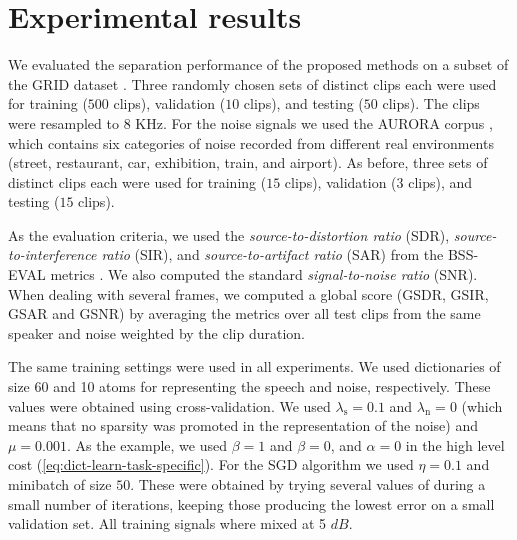 \section{Experimental results}
\label{sec:experiments}

 We evaluated the separation performance of the proposed methods on a subset of the GRID dataset \cite{cooke2006audio}. 
Three randomly chosen sets of distinct clips each were used for training ($500$ clips), validation ($10$ clips), and testing ($50$ clips).
The clips were resampled to $8$ KHz. For the noise signals we used the AURORA corpus \cite{PearceH00}, which contains six categories of noise recorded from different real environments (street, restaurant, car, exhibition, train, and airport). As before, three sets of distinct clips each were used for training ($15$ clips), validation ($3$ clips), and testing ($15$ clips).

 As the evaluation criteria, we used the \emph{source-to-distortion ratio} (SDR), \emph{source-to-interference ratio} (SIR), and
\emph{source-to-artifact ratio} (SAR) from the BSS-EVAL metrics \cite{vincent2006performance}. 
%
We also computed the standard \emph{signal-to-noise ratio} (SNR).
%
When dealing with several frames, we computed a global score (GSDR, GSIR, GSAR and GSNR) by averaging the metrics over all test clips from the same speaker and noise weighted by the clip duration.

 The same training settings were used in all experiments.
We used dictionaries of size 60 and 10 atoms for representing the speech and noise, respectively. These values were obtained
using cross-validation. We used $\lambda_{\mathrm{s}}=0.1$ and $\lambda_{\mathrm{n}}=0$ (which means that no sparsity was promoted in the representation of the noise)
and $\mu=0.001$. As the example, we used $\beta=1$ and $\beta=0$, and $\alpha=0$ in the high level cost  (\ref{eq:dict-learn-task-specific}).
%
For the SGD algorithm we used $\eta=0.1$ and minibatch of size $50$. These were obtained by trying several values of during a small number of iterations, keeping those producing the lowest error on a small validation set. 
%
All training signals where mixed at 5 $dB$.

